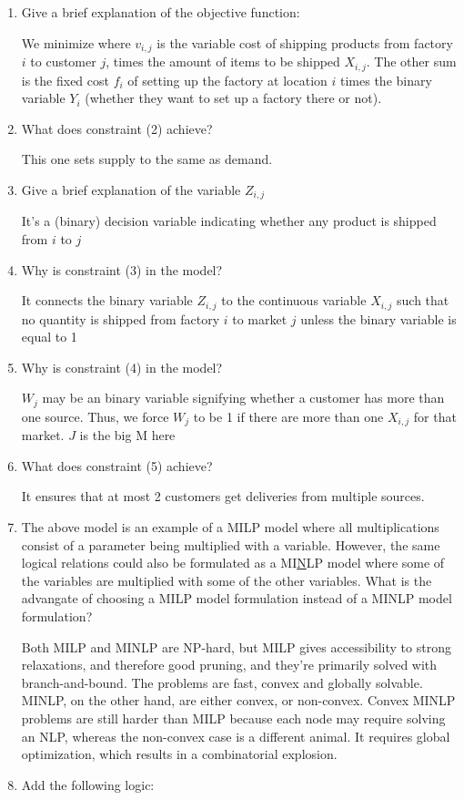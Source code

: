 \documentclass[10pt]{article}
\begin{document}
\begin{enumerate}
    \item Give a brief explanation of the objective function: 

    We minimize where $v_{i, j} $ is the variable cost of shipping products from factory $i $ to customer $ j $, times the amount of items to be shipped $X_{i, j} $. The other sum is the fixed cost $f_i $ of setting up the factory at location $i $ times the binary variable $Y_i $ (whether they want to set up a factory there or not). 
    \item What does constraint (2) achieve?

    This one sets supply to the same as demand. 
    \item Give a brief explanation of the variable $Z_{i, j} $

    It's a (binary) decision variable indicating whether any product is shipped from $i $ to $j $
    \item Why is constraint (3) in the model?

    It connects the binary variable $Z_{i, j} $ to the continuous variable $X_{i, j} $ such that no quantity is shipped from factory $i $ to market $j $ unless the binary variable is equal to 1
    \item Why is constraint (4) in the model?

    $W_j $ may be an binary variable signifying whether a customer has more than one source. Thus, we force $W_j $ to be 1 if there are more than one $X_{i, j} $ for that market. $J $ is the big M here
    \item What does constraint (5) achieve?

    It ensures that at most 2 customers get deliveries from multiple sources. 
    \newpage
    \item The above model is an example of a MILP model where all multiplications consist of a parameter being multiplied with a variable. However, the same logical relations could also be formulated as a MI\underline{N}LP model where some of the variables are multiplied with some of the other variables. What is the advangate of choosing a MILP model formulation instead of a MINLP model formulation?

    Both MILP and MINLP are NP-hard, but MILP gives accessibility to strong relaxations, and therefore good pruning, and they're primarily solved with branch-and-bound. The problems are fast, convex and globally solvable. MINLP, on the other hand, are either convex, or non-convex. Convex MINLP problems are still harder than MILP because each node may require solving an NLP, whereas the non-convex case is a different animal. It requires global optimization, which results in a combinatorial explosion. 
    \item Add the following logic: 


\end{enumerate}
\end{document}
